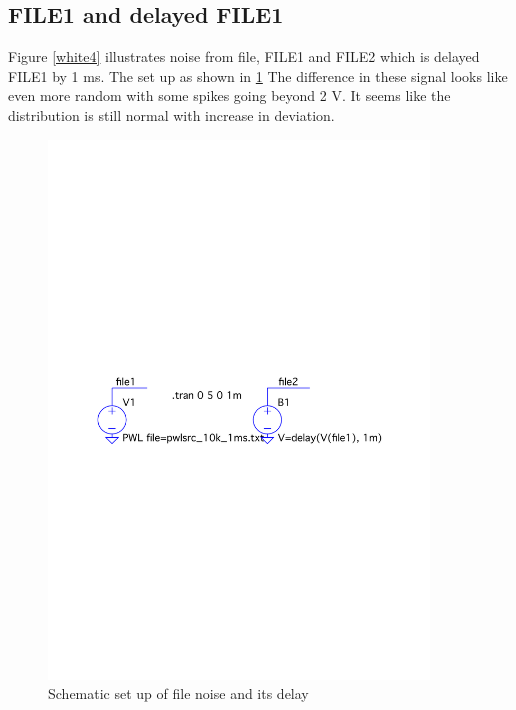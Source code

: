 \documentclass[12pt,a4paper,UKenglish]{article}
\begin{document}
\subsection{FILE1 and delayed FILE1}
 Figure \ref{white4} illustrates noise from file, FILE1 and FILE2 which is delayed FILE1 by 1 ms. The set up as shown in \ref{sch_5d} The difference in these signal looks like even more random with some spikes going beyond 2 V. It seems like the distribution is still normal with increase in deviation. 
 \begin{figure} [H]
  \centering 
  \includegraphics[width=0.9\textwidth]{img/sch_5d.pdf} 
  \caption{Schematic set up of file noise and its delay}
  \label{sch_5d} 
\end{figure}
\end{document}
